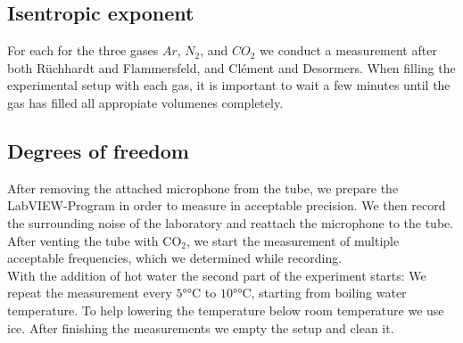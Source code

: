 \documentclass[../main.tex]{subfiles}
\begin{document}
\subsection{Isentropic exponent}
    For each for the three gases $Ar$, $N_2$, and $CO_2$ we conduct a measurement after both Rüchhardt and Flammersfeld, and Clément and Desormers. When filling the experimental setup with each gas, it is important to wait a few minutes until the gas has filled all appropiate volumenes completely.

\subsection{Degrees of freedom}
    After removing the attached microphone from the tube, we prepare the LabVIEW-Program in order to measure in acceptable precision. We then record the surrounding noise of the laboratory and reattach the microphone to the tube. After venting the tube with $\text{CO}_2$, we start the measurement of multiple acceptable frequencies, which we determined while recording. \\

    With the addition of hot water the second part of the experiment starts: We repeat the measurement every $5\si{\degree\celsius}$ to $10\si{\degree\celsius}$, starting from boiling water temperature. To help lowering the temperature below room temperature we use ice. After finishing the measurements we empty the setup and clean it.
   
\end{document}
